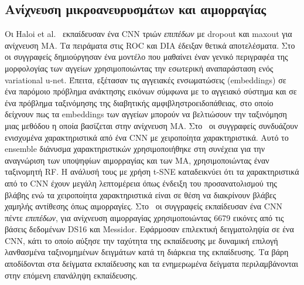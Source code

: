 \subsection{Ανίχνευση μικροανευρυσμάτων και αιμορραγίας}
Οι Haloi et al.~\cite{haloi2015improved} εκπαίδευσαν ένα CNN τριών \textit{επιπέδων} με dropout και maxout για ανίχνευση ΜΑ.
Τα πειράματα στις ROC και DIA έδειξαν θετικά αποτελέσματα.
Στο~\cite{giancardo2017representation} οι συγγραφείς δημιούργησαν ένα μοντέλο που μαθαίνει έναν γενικό περιγραφέα της μορφολογίας των αγγείων χρησιμοποιώντας την εσωτερική αναπαράσταση ενός variational u-net.
Έπειτα, εξέτασαν τις αγγειακές ενσωματώσεις (embeddings) σε ένα παρόμοιο πρόβλημα ανάκτησης εικόνων σύμφωνα με το αγγειακό σύστημα και σε ένα πρόβλημα ταξινόμησης της διαβητικής αμφιβληστροειδοπάθειας, στο οποίο δείχνουν πως τα embeddings των αγγείων μπορούν να βελτιώσουν την ταξινόμηση μιας μεθόδου η οποία βασίζεται στην ανίχνευση ΜΑ.
Στο~\cite{orlando2018ensemble} οι συγγραφείς συνδυάζουν ενισχυμένα χαρακτηριστικά από ένα CNN με χειροποίητα χαρακτηριστικά.
Αυτό το ensemble διάνυσμα χαρακτηριστικών χρησιμοποιήθηκε στη συνέχεια για την αναγνώριση των υποψηφίων αιμορραγίας και των ΜΑ, χρησιμοποιώντας έναν ταξινομητή RF\@.
Η ανάλυσή τους με χρήση t-SNE καταδεικνύει ότι τα χαρακτηριστικά από το CNN έχουν μεγάλη λεπτομέρεια όπως ένδειξη του προσανατολισμού της βλάβης ενώ τα χειροποίητα χαρακτηριστικά είναι σε θέση να διακρίνουν βλάβες χαμηλής αντίθεσης όπως αιμορραγίες.
Στο~\cite{van2016fast} οι συγγραφείς εκπαίδευσαν ένα CNN πέντε \textit{επιπέδων}, για ανίχνευση αιμορραγίας χρησιμοποιώντας 6679 εικόνες από τις βάσεις δεδομένων DS16 και Messidor.
Εφάρμοσαν επιλεκτική δειγματοληψία σε ένα CNN, κάτι το οποίο αύξησε την ταχύτητα της εκπαίδευσης με δυναμική επιλογή λανθασμένα ταξινομημένων δειγμάτων κατά τη διάρκεια της εκπαίδευσης.
Τα βάρη αποδίδονται στα δείγματα εκπαίδευσης και τα ενημερωμένα δείγματα περιλαμβάνονται στην επόμενη επανάληψη εκπαίδευσης.

